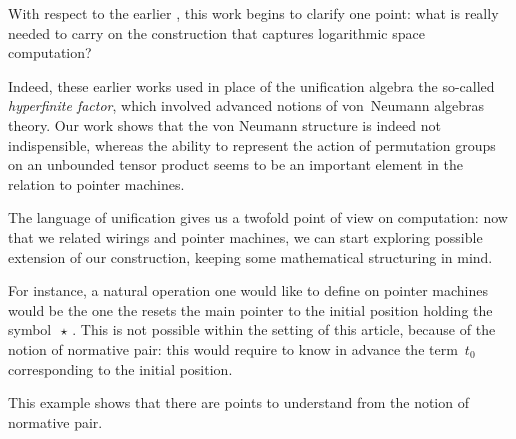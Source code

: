 With respect to the earlier \cite{girard_normativity_2012,aubert_characterizing_2012,seiller_logarithmic_2013}, this work begins to clarify one point: what is really needed to carry on the construction that captures logarithmic space computation?

Indeed, these earlier works used in place of the unification algebra the so-called \emph{hyperfinite factor}, which involved advanced notions of von~Neumann algebras theory.
Our work shows that the von Neumann structure is indeed not indispensible, whereas the ability to represent the action of permutation groups on an unbounded tensor product seems to be an important element in the relation to pointer machines.

\smallskip
The language of unification gives us a twofold point of view on computation: now that we related wirings and pointer machines, we can start exploring possible extension of our construction, keeping some mathematical structuring in mind.

For instance, a natural operation one would like to define on pointer machines would be the one the resets the main pointer to the initial position holding the symbol $\,\star\,$.
This is not possible within the setting of this article, because of the notion of normative pair: this would require to know in advance the term $\,t_0\,$ corresponding to the initial position.

\smallskip
This example shows that there are points to understand from the notion of normative pair. 
